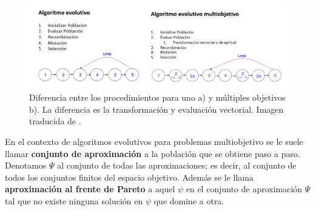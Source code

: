 \begin{figure}[H]
    \centering
    \includegraphics[width=\textwidth]{Figuras/MOEA_EA.png}
    \caption[MOEAs vs EAs]{Diferencia entre los procedimientos para uno a) y múltiples objetivos b). La diferencia es la transformación y evaluación vectorial. Imagen traducida de \cite{coelloEvolutionaryAlgorithmsSolving}.}
    \label{fig:MOEA_EA}
\end{figure}


En el contexto de algoritmos evolutivos para problemas multiobjetivo se le suele llamar \textbf{conjunto de aproximación} a la población que se obtiene paso a paso. Denotamos $\Psi$ al conjunto de todas las aproximaciones; es decir, al conjunto de todos los conjuntos finitos del espacio objetivo. Además se le llama \textbf{aproximación al frente de Pareto} a aquel $\psi$ en el conjunto de aproximación $\Psi$ tal que no existe ninguna solución en $\psi$ que domine a otra. 





